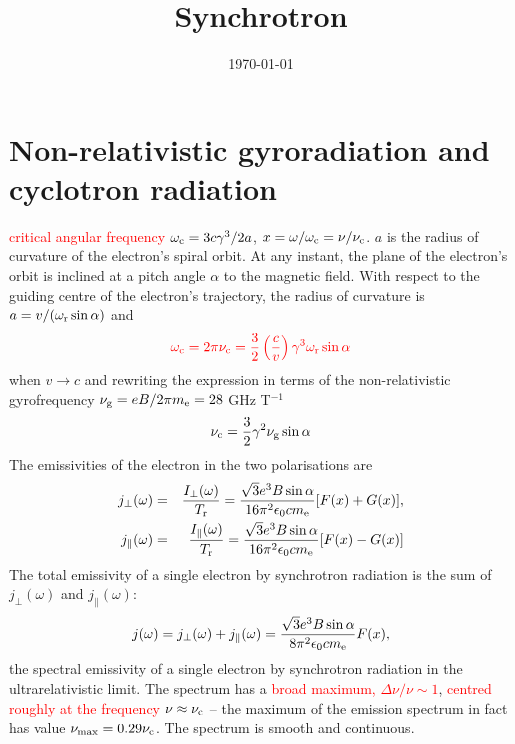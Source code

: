\documentclass[12pt,a4paper]{article}
\title{Synchrotron}
\author{}
\date{\today}
\begin{document}
\maketitle


\section{Non-relativistic gyroradiation and cyclotron radiation}


\textcolor{red}{critical angular frequency $\omega_{\rm c} = 3c\gamma^3/2a$}, $x = \omega/\omega_{\rm c} = \nu/\nu_{\rm c}$. $a$ is the radius of curvature of the electron’s spiral orbit. At any instant, the plane of the electron’s orbit is inclined at a pitch angle $\alpha$ to the magnetic field. With respect to the guiding centre of the electron’s trajectory, the radius of curvature is \textcolor{red}{$a = v/(\omega_{\rm r} \sin \alpha)$} and 
\begin{equation}
\textcolor{red}{\omega_{\rm c} = 2\pi \nu_{\rm c} = \frac{3}{2} \left(\frac{c}{v} \right) \gamma^3 \omega_{\rm r} \sin \alpha}
\end{equation}
when $v \rightarrow c$ and rewriting the expression in terms of the non-relativistic gyrofrequency $\nu_{\rm g} = eB/2\pi m_{\rm e} = 28$ GHz T$^{-1}$
\begin{equation}
\nu_{\rm c} = \frac{3}{2} \gamma^2 \nu_{\rm g} \sin \alpha
\end{equation}
The emissivities of the electron in the two polarisations are
\begin{eqnarray}
j_{\perp}(\omega) &=& \frac{I_{\perp}(\omega)}{T_{\rm r}} = \frac{\sqrt{3} e^3 B \sin \alpha}{16 \pi^2 \epsilon_0 c m_{\rm e}} [F(x) +G(x)], \\
j_{\parallel}(\omega) &=& \frac{I_{\parallel}(\omega)}{T_{\rm r}} = \frac{\sqrt{3} e^3 B \sin \alpha}{16 \pi^2 \epsilon_0 c m_{\rm e}} [F(x) -G(x)]
\end{eqnarray}
The total emissivity of a single electron by synchrotron radiation is the sum of $j_{\perp}(\omega)$ and
$j_{\parallel}(\omega)$:
\begin{equation}
j(\omega) = j_{\perp}(\omega) + j_{\parallel}(\omega) = \frac{\sqrt{3} e^3 B \sin \alpha}{8 \pi^2 \epsilon_0 c m_{\rm e}} F(x) , 
\end{equation}
the spectral emissivity of a single electron by synchrotron radiation in the ultrarelativistic limit. The spectrum has a \textcolor{red}{broad maximum, $\Delta \nu/\nu \sim 1$}, \textcolor{red}{centred roughly at the frequency $\nu \approx \nu_{\rm c}$} – the maximum of the emission spectrum in fact has value \textcolor{red}{$\nu_{\rm max} = 0.29\nu_{\rm c}$}. The spectrum is smooth and continuous.
\end{document}
